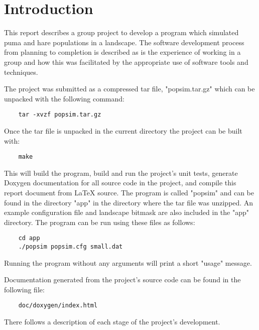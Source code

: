 \section{Introduction}
\label{Introduction}
This report describes a group project to develop a program which simulated puma and hare populations in a landscape.  
The software development process from planning to completion is described as is the experience of working in a group and how this was facilitated by the appropriate use of software tools and techniques.

The project was submitted as a compressed tar file, "popsim.tar.gz" which can be unpacked with the following command:

\begin{lstlisting}
	tar -xvzf popsim.tar.gz
\end{lstlisting}

Once the tar file is unpacked in the current directory the project can be built with:

\begin{lstlisting}
	make
\end{lstlisting}

This will build the program, build and run the project's unit tests, generate Doxygen documentation for all source code in the project, and compile this report document from LaTeX source.  The program is called "popsim" and can be found in the directory "app" in the directory where the tar file was unzipped.  An example configuration file and landscape bitmask are also included in the "app" directory.  The program can be run using these files as follows:

\begin{lstlisting}
	cd app
	./popsim popsim.cfg small.dat
\end{lstlisting}

Running the program without any arguments will print a short "usage" message.

Documentation generated from the project's source code can be found in the following file:

\begin{lstlisting}
	doc/doxygen/index.html
\end{lstlisting}

There follows a description of each stage of the project's development.
